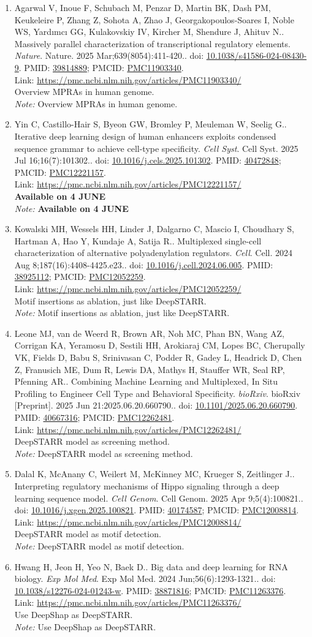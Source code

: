 \documentclass[12pt]{article}
\newcommand{\Pub}[9]{%
  \item #1. #2. \textit{#3}. #4. doi: \href{https://doi.org/#5}{#5}. PMID: \href{https://pubmed.ncbi.nlm.nih.gov/#6/}{#6}; PMCID: \href{https://www.ncbi.nlm.nih.gov/pmc/articles/#7/}{#7}. \\
  \noindent Link: \url{#8}\\
  \ifx#9\relax\else\\\textit{Note:} #9\fi
}
\begin{document}
\begin{enumerate}[leftmargin=*,label=\textbf{\arabic*.}]
\Pub{Agarwal V, Inoue F, Schubach M, Penzar D, Martin BK, Dash PM, Keukeleire P, Zhang Z, Sohota A, Zhao J, Georgakopoulos-Soares I, Noble WS, Yardımcı GG, Kulakovskiy IV, Kircher M, Shendure J, Ahituv N.}{Massively parallel characterization of transcriptional regulatory elements}{Nature}{Nature. 2025 Mar;639(8054):411-420.}{10.1038/s41586-024-08430-9}{39814889}{PMC11903340}{https://pmc.ncbi.nlm.nih.gov/articles/PMC11903340/}{Overview MPRAs in human genome.}

\Pub{Yin C, Castillo-Hair S, Byeon GW, Bromley P, Meuleman W, Seelig G.}{Iterative deep learning design of human enhancers exploits condensed sequence grammar to achieve cell-type specificity}{Cell Syst}{Cell Syst. 2025 Jul 16;16(7):101302.}{10.1016/j.cels.2025.101302}{40472848}{PMC12221157}{https://pmc.ncbi.nlm.nih.gov/articles/PMC12221157/}{\textbf{Available on 4 JUNE}}

\Pub{Kowalski MH, Wessels HH, Linder J, Dalgarno C, Mascio I, Choudhary S, Hartman A, Hao Y, Kundaje A, Satija R.}{Multiplexed single-cell characterization of alternative polyadenylation regulators}{Cell}{Cell. 2024 Aug 8;187(16):4408-4425.e23.}{10.1016/j.cell.2024.06.005}{38925112}{PMC12052259}{https://pmc.ncbi.nlm.nih.gov/articles/PMC12052259/}{Motif insertions as ablation, just like DeepSTARR.}

\Pub{Leone MJ, van de Weerd R, Brown AR, Noh MC, Phan BN, Wang AZ, Corrigan KA, Yeramosu D, Sestili HH, Arokiaraj CM, Lopes BC, Cherupally VK, Fields D, Babu S, Srinivasan C, Podder R, Gadey L, Headrick D, Chen Z, Franusich ME, Dum R, Lewis DA, Mathys H, Stauffer WR, Seal RP, Pfenning AR.}{Combining Machine Learning and Multiplexed, In Situ Profiling to Engineer Cell Type and Behavioral Specificity}{bioRxiv}{bioRxiv [Preprint]. 2025 Jun 21:2025.06.20.660790.}{10.1101/2025.06.20.660790}{40667316}{PMC12262481}{https://pmc.ncbi.nlm.nih.gov/articles/PMC12262481/}{DeepSTARR model as screening method.}

\Pub{Dalal K, McAnany C, Weilert M, McKinney MC, Krueger S, Zeitlinger J.}{Interpreting regulatory mechanisms of Hippo signaling through a deep learning sequence model}{Cell Genom}{Cell Genom. 2025 Apr 9;5(4):100821.}{10.1016/j.xgen.2025.100821}{40174587}{PMC12008814}{https://pmc.ncbi.nlm.nih.gov/articles/PMC12008814/}{DeepSTARR model as motif detection.}

\Pub{Hwang H, Jeon H, Yeo N, Baek D.}{Big data and deep learning for RNA biology}{Exp Mol Med}{Exp Mol Med. 2024 Jun;56(6):1293-1321.}{10.1038/s12276-024-01243-w}{38871816}{PMC11263376}{https://pmc.ncbi.nlm.nih.gov/articles/PMC11263376/}{Use DeepShap as DeepSTARR.}


\end{enumerate}
\end{document}
